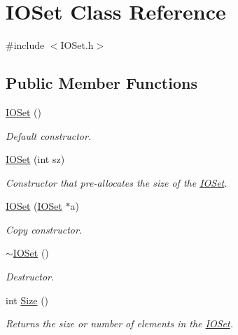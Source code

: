 \hypertarget{class_i_o_set}{
\section{IOSet Class Reference}
\label{class_i_o_set}
}


{\ttfamily \#include $<$IOSet.h$>$}

\subsection*{Public Member Functions}
\begin{DoxyCompactItemize}
\item 
\hyperlink{class_i_o_set_abdbbcdcb45f79251f492e0ad97a45706}{IOSet} ()
\begin{DoxyCompactList}\small\item\em Default constructor. \item\end{DoxyCompactList}\item 
\hyperlink{class_i_o_set_a134dbafdf32adadb409a786e1f23c9d7}{IOSet} (int sz)
\begin{DoxyCompactList}\small\item\em Constructor that pre-\/allocates the size of the \hyperlink{class_i_o_set}{IOSet}. \item\end{DoxyCompactList}\item 
\hyperlink{class_i_o_set_a30b5f06491792abcffbae5aa217096d4}{IOSet} (\hyperlink{class_i_o_set}{IOSet} $\ast$a)
\begin{DoxyCompactList}\small\item\em Copy constructor. \item\end{DoxyCompactList}\item 
\hyperlink{class_i_o_set_a4f919f20d760efdc02ad2d4ac044eaba}{$\sim$IOSet} ()
\begin{DoxyCompactList}\small\item\em Destructor. \item\end{DoxyCompactList}\item 
int \hyperlink{class_i_o_set_a384b704b09e77138e99ef914d69995e0}{Size} ()
\begin{DoxyCompactList}\small\item\em Returns the size or number of elements in the \hyperlink{class_i_o_set}{IOSet}. \item\end{DoxyCompactList}\item 

\end{DoxyCompactItemize}
